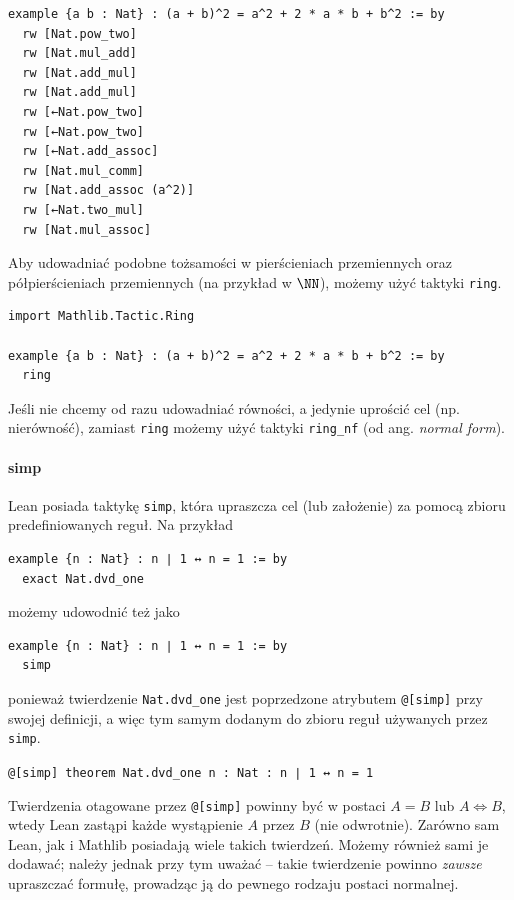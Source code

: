 \documentclass[polish,pretty,bibliography=totocnumbered]{angav}
\newcommand{\Lean}[1]{\texttt{#1}}
\newcommand{\centerLean}[2][]{\begin{center}\Lean{#2}#1\end{center}}
\begin{document}
\begin{verbatim}
example {a b : Nat} : (a + b)^2 = a^2 + 2 * a * b + b^2 := by
  rw [Nat.pow_two]
  rw [Nat.mul_add]
  rw [Nat.add_mul]
  rw [Nat.add_mul]
  rw [←Nat.pow_two]
  rw [←Nat.pow_two]
  rw [←Nat.add_assoc]
  rw [Nat.mul_comm]
  rw [Nat.add_assoc (a^2)]
  rw [←Nat.two_mul]
  rw [Nat.mul_assoc]
\end{verbatim}

Aby udowadniać podobne tożsamości w pierścieniach przemiennych oraz półpierścieniach przemiennych (na przykład w $\NN$), możemy użyć taktyki \Lean{ring}.
\begin{verbatim}
import Mathlib.Tactic.Ring

example {a b : Nat} : (a + b)^2 = a^2 + 2 * a * b + b^2 := by
  ring
\end{verbatim}

Jeśli nie chcemy od razu udowadniać równości, a jedynie uprościć cel (np. nierówność), zamiast \Lean{ring} możemy użyć taktyki \Lean{ring_nf} (od ang. \textit{normal form}).

\paragraph{simp}
Lean posiada taktykę \Lean{simp}, która upraszcza cel (lub założenie) za pomocą zbioru predefiniowanych reguł. Na przykład
\begin{verbatim}
example {n : Nat} : n ∣ 1 ↔ n = 1 := by
  exact Nat.dvd_one
\end{verbatim}
możemy udowodnić też jako
\begin{verbatim}
example {n : Nat} : n ∣ 1 ↔ n = 1 := by
  simp
\end{verbatim}
ponieważ twierdzenie \Lean{Nat.dvd_one} jest poprzedzone atrybutem \Lean{@[simp]} przy swojej definicji, a więc tym samym dodanym do zbioru reguł używanych przez \Lean{simp}.
\centerLean{@[simp] theorem Nat.dvd_one {n : Nat} : n ∣ 1 ↔ n = 1}
Twierdzenia otagowane przez \Lean{@[simp]} powinny być w postaci $A = B$ lub $A \Leftrightarrow B$, wtedy Lean zastąpi każde wystąpienie $A$ przez $B$ (nie odwrotnie).
Zarówno sam Lean, jak i Mathlib posiadają wiele takich twierdzeń. Możemy również sami je dodawać; należy jednak przy tym uważać -- takie twierdzenie powinno \emph{zawsze} upraszczać formułę, prowadząc ją do pewnego rodzaju postaci normalnej.
\end{document}
